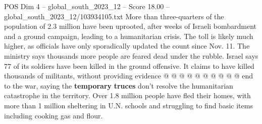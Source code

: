 \begin{textsample}{POS Dim 4 – global\_south\_2023\_12 – Score 18.00 – global\_south\_2023\_12/103934105.txt}
More than three-quarters of the population of 2.3 million have been uprooted, after weeks of Israeli bombardment and a ground campaign, leading to a humanitarian crisis.
The toll is likely much higher, as officials have only sporadically updated the count since Nov. 11.
The ministry says thousands more people are feared dead under the rubble.
Israel says 77 of its soldiers have been killed in the ground offensive.
It claims to have killed thousands of militants, without providing evidence @ @ @ @ @ @ @ @ @ @ end to the war, saying the \textbf{temporary} \textbf{truces} don't resolve the humanitarian catastrophe in the territory.
Over 1.8 million people have fled their homes, with more than 1 million sheltering in U.N. schools and struggling to find basic items including cooking gas and flour.

\end{textsample}
